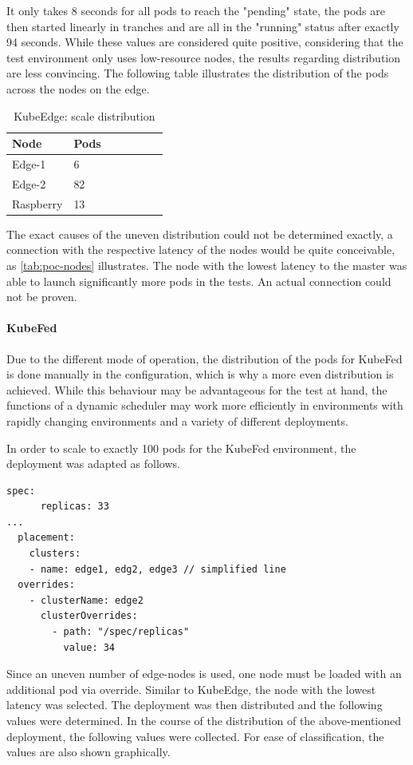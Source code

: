 \documentclass[MSC,Master,english]{twbook}%
\begin{document}
It only takes 8 seconds for all pods to reach the "pending" state, the pods are then started linearly in tranches and are all in the "running" status after exactly 94 seconds. While these values are considered quite positive, considering that the test environment only uses low-resource nodes, the results regarding distribution are less convincing. The following table illustrates the distribution of the pods across the nodes on the edge.

\begin{table}[ht]
    \begin{center}
        \begin{tabular}{|l|l|l|l|l|l|l|}
            \hline
            Node & Pods  \\
            \hline
            Edge-1 & 6  \\
            Edge-2 & 82  \\
            Raspberry & 13 \\
            \hline
        \end{tabular}
        \caption{KubeEdge: scale distribution}
        \label{tab:ke-scale-distribution}
    \end{center}
\end{table}

The exact causes of the uneven distribution could not be determined exactly, a connection with the respective latency of the nodes would be quite conceivable, as \autoref{tab:poc-nodes} illustrates. The node with the lowest latency to the master was able to launch significantly more pods in the tests. An actual connection could not be proven.

\paragraph{KubeFed} Due to the different mode of operation, the distribution of the pods for KubeFed is done manually in the configuration, which is why a more even distribution is achieved. While this behaviour may be advantageous for the test at hand, the functions of a dynamic scheduler may work more efficiently in environments with rapidly changing environments and a variety of different deployments. \par
In order to scale to exactly 100 pods for the KubeFed environment, the deployment was adapted as follows.
\vspace{\baselineskip}
\begin{lstlisting}[caption={KubeFed scale adaptations},captionpos=b]
    spec:
      replicas: 33
...
  placement:
    clusters:
    - name: edge1, edg2, edge3 // simplified line
  overrides:
    - clusterName: edge2
      clusterOverrides:
        - path: "/spec/replicas"
          value: 34
\end{lstlisting}
\par
Since an uneven number of edge-nodes is used, one node must be loaded with an additional pod via override. Similar to KubeEdge, the node with the lowest latency was selected. The deployment was then distributed and the following values were determined. In the course of the distribution of the above-mentioned deployment, the following values were collected. For ease of classification, the values are also shown graphically.
\end{document}
